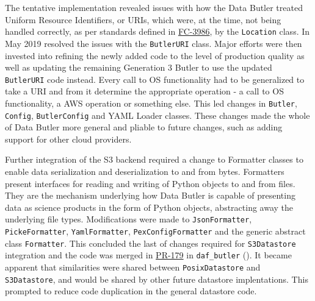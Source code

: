 The tentative implementation revealed issues with how the Data Butler treated Uniform Resource Identifiers, or URIs, which were, at the time, not being handled correctly, as per standards defined in \href{https://tools.ietf.org/html/rfc3986}{FC-3986}, by the \texttt{Location} class.
In May 2019  resolved the issues with the \texttt{ButlerURI} class.
Major efforts were then invested into refining the newly added code to the level of production quality as well as updating the remaining Generation 3 Butler to use the updated \texttt{ButlerURI} code instead. Every call to OS functionality had to be generalized to take a URI and from it determine the appropriate operation - a call to OS functionality, a AWS operation or something else. This led changes in \texttt{Butler}, \texttt{Config}, \texttt{ButlerConfig} and YAML Loader classes. These changes made the whole of Data Butler more general and pliable to future changes, such as adding support for other cloud providers.

Further integration of the S3 backend required a change to Formatter classes to enable data serialization and deserialization to and from bytes. Formatters present interfaces for reading and writing of Python objects to and from files. They are the mechanism underlying how Data Butler is capable of presenting data as science products in the form of Python objects, abstracting away the underlying file types. Modifications were made to \texttt{JsonFormatter}, \texttt{PickeFormatter}, \texttt{YamlFormatter}, \texttt{PexConfigFormatter} and the generic abstract class \texttt{Formatter}.
This concluded the last of changes required for \texttt{S3Datastore} integration and the code was merged in \href{https://github.com/lsst/daf_butler/pull/179}{PR-179} in \texttt{daf\_butler} ().
It became apparent that similarities were shared between \texttt{PosixDatastore} and \texttt{S3Datastore}, and would be shared by other future datastore implentations.
This prompted  to reduce code duplication in the general datastore code.


